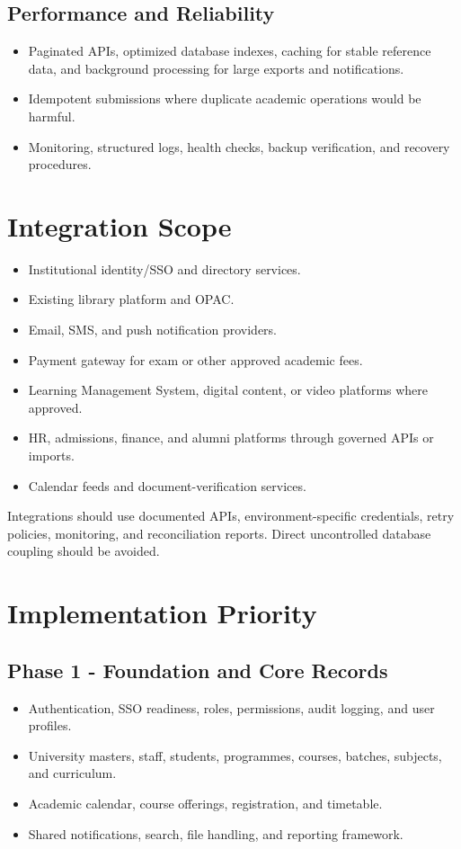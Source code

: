 \documentclass[10pt,a4paper]{article}
\begin{document}
\subsection{Performance and Reliability}
\begin{itemize}
  \item Paginated APIs, optimized database indexes, caching for stable reference data,
        and background processing for large exports and notifications.
  \item Idempotent submissions where duplicate academic operations would be harmful.
  \item Monitoring, structured logs, health checks, backup verification, and recovery procedures.
\end{itemize}

\section{Integration Scope}

\begin{itemize}
  \item Institutional identity/SSO and directory services.
  \item Existing library platform and OPAC.
  \item Email, SMS, and push notification providers.
  \item Payment gateway for exam or other approved academic fees.
  \item Learning Management System, digital content, or video platforms where approved.
  \item HR, admissions, finance, and alumni platforms through governed APIs or imports.
  \item Calendar feeds and document-verification services.
\end{itemize}

Integrations should use documented APIs, environment-specific credentials,
retry policies, monitoring, and reconciliation reports. Direct uncontrolled
database coupling should be avoided.

\newpage
\section{Implementation Priority}

\subsection{Phase 1 - Foundation and Core Records}
\begin{itemize}
  \item Authentication, SSO readiness, roles, permissions, audit logging, and user profiles.
  \item University masters, staff, students, programmes, courses, batches, subjects, and curriculum.
  \item Academic calendar, course offerings, registration, and timetable.
  \item Shared notifications, search, file handling, and reporting framework.
\end{itemize}
\end{document}
